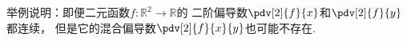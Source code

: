 \begin{example}
举例说明：即便二元函数\(f\colon\mathbb{R}^2\to\mathbb{R}\)的
二阶偏导数\(\pdv[2]{f}{x}\)和\(\pdv[2]{f}{y}\)都连续，
但是它的混合偏导数\(\pdv[2]{f}{x}{y}\)也可能不存在.
\end{example}

